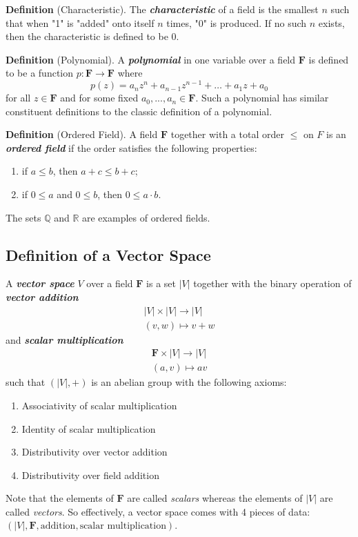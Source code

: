 \textbf{Definition} (Characteristic). The \textbf{\textit{characteristic}} of a field is the smallest $n$ such that when "1" is "added" onto itself $n$ times, "0" is produced. If no such $n$ exists, then the characteristic is defined to be 0.

\textbf{Definition} (Polynomial). A \textbf{\textit{polynomial}} in one variable over a field $\mathbf{F}$ is defined to be a function $p:\mathbf{F}\to\mathbf{F}$ where
\[
p(z)=a_nz^n+a_{n-1}z^{n-1}+\ldots+a_1z+a_0
\]
for all $z\in\mathbf{F}$ and for some fixed $a_0,...,a_n\in\mathbf{F}$. Such a polynomial has similar constituent definitions to the classic definition of a polynomial.

\textbf{Definition} (Ordered Field). A field $\mathbf{F}$ together with a total order $\leq$ on $F$ is an \textbf{\textit{ordered field}} if the order satisfies the following properties:
\begin{enumerate}
    \item if $a\leq b$, then $a+c\leq b+c$;
    \item if $0\leq a$ and $0\leq b$, then $0\leq a\cdot b$.
\end{enumerate}
The sets $\mathbb{Q}$ and $\mathbb{R}$ are examples of ordered fields.


\subsection{Definition of a Vector Space}
A \textbf{\textit{vector space}} $V$ over a field $\mathbf{F}$ is a set $|V|$ together with the binary operation of \textbf{\textit{vector addition}}
\begin{align*}
    |V|\times|V|\to|V| \\
    (v,w)\mapsto v + w
\end{align*}
and \textbf{\textit{scalar multiplication}}
\begin{align*}
    \mathbf{F}\times|V|\to|V| \\
    (a,v)\mapsto av
\end{align*}
such that $(|V|,+)$ is an abelian group with the following axioms:
\begin{enumerate}
    \item Associativity of scalar multiplication
    \item Identity of scalar multiplication
    \item Distributivity over vector addition
    \item Distributivity over field addition
\end{enumerate}
Note that the elements of $\mathbf{F}$ are called \textit{scalars} whereas the elements of $|V|$ are called \textit{vectors}. So effectively, a vector space comes with 4 pieces of data: $(|V|, \mathbf{F}, \text{addition}, \text{scalar multiplication})$.



\newpage %

\newpage


